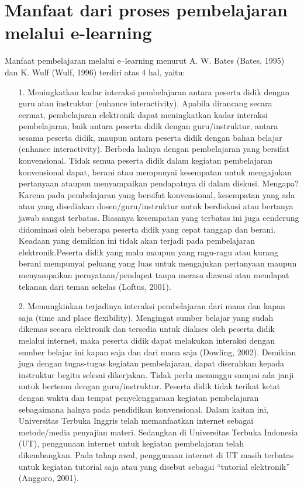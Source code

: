 \documentclass{jtetiproposalskripsi}
\begin{document}
\section{Manfaat dari proses pembelajaran melalui e-learning}
Manfaat pembelajaran melalui e–learning menurut A. W. Bates (Bates, 1995) dan K. Wulf (Wulf, 1996) terdiri atas 4 hal, yaitu:
\begin{itemize}
\item[1.]Meningkatkan kadar interaksi pembelajaran antara peserta didik dengan guru atau instruktur (enhance interactivity). Apabila dirancang secara cermat, pembelajaran elektronik dapat meningkatkan kadar interaksi pembelajaran, baik antara peserta didik dengan guru/instruktur, antara sesama peserta didik, maupun antara peserta didik dengan bahan belajar (enhance interactivity). Berbeda halnya dengan pembelajaran yang bersifat konvensional. Tidak semua peserta didik dalam kegiatan pembelajaran konvensional dapat, berani atau mempunyai kesempatan untuk mengajukan pertanyaan ataupun menyampaikan pendapatnya di dalam diskusi. Mengapa? Karena pada pembelajaran yang bersifat konvensional, kesempatan yang ada atau yang disediakan dosen/guru/instruktur untuk berdiskusi atau bertanya jawab sangat terbatas. Biasanya kesempatan yang terbatas ini juga cenderung didominasi oleh beberapa peserta didik yang cepat tanggap dan berani. Keadaan yang demikian ini tidak akan terjadi pada pembelajaran elektronik.Peserta didik yang malu maupun yang ragu-ragu atau kurang berani mempunyai peluang yang luas untuk mengajukan pertanyaan maupun menyampaikan pernyataan/pendapat tanpa merasa diawasi atau mendapat tekanan dari teman sekelas (Loftus, 2001). 
\item[2.]Memungkinkan terjadinya interaksi pembelajaran dari mana dan kapan saja (time and place flexibility). Mengingat sumber belajar yang sudah dikemas secara elektronik dan tersedia untuk diakses oleh peserta didik melalui internet, maka peserta didik dapat melakukan interaksi dengan sumber belajar ini kapan saja dan dari mana saja (Dowling, 2002). Demikian juga dengan tugas-tugas kegiatan pembelajaran, dapat diserahkan kepada instruktur begitu selesai dikerjakan. Tidak perlu menunggu sampai ada janji untuk bertemu dengan guru/instruktur. Peserta didik tidak terikat ketat dengan waktu dan tempat penyelenggaraan kegiatan pembelajaran sebagaimana halnya pada pendidikan konvensional. Dalam kaitan ini, Universitas Terbuka Inggris telah memanfaatkan internet sebagai metode/media penyajian materi. Sedangkan di Universitas Terbuka Indonesia (UT), penggunaan internet untuk kegiatan pembelajaran telah dikembangkan. Pada tahap awal, penggunaan internet di UT masih terbatas untuk kegiatan tutorial saja atau yang disebut sebagai “tutorial elektronik” (Anggoro, 2001).

\end{itemize}
\end{document}
